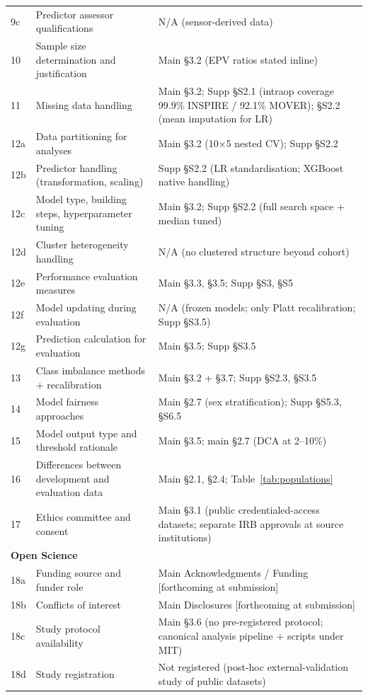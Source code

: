 \documentclass[11pt,a4paper]{article}
\begin{document}
\begin{longtable}{p{}p{}p{}}
9c  & Predictor assessor qualifications & N/A (sensor-derived data) \\
10  & Sample size determination and justification & Main §3.2 (EPV ratios stated inline) \\
11  & Missing data handling & Main §3.2; Supp §S2.1 (intraop coverage 99.9\% INSPIRE / 92.1\% MOVER); §S2.2 (mean imputation for LR) \\
12a & Data partitioning for analyses & Main §3.2 (10×5 nested CV); Supp §S2.2 \\
12b & Predictor handling (transformation, scaling) & Supp §S2.2 (LR standardisation; XGBoost native handling) \\
12c & Model type, building steps, hyperparameter tuning & Main §3.2; Supp §S2.2 (full search space + median tuned) \\
12d & Cluster heterogeneity handling & N/A (no clustered structure beyond cohort) \\
12e & Performance evaluation measures & Main §3.3, §3.5; Supp §S3, §S5 \\
12f & Model updating during evaluation & N/A (frozen models; only Platt recalibration; Supp §S3.5) \\
12g & Prediction calculation for evaluation & Main §3.5; Supp §S3.5 \\
13  & Class imbalance methods + recalibration & Main §3.2 + §3.7; Supp §S2.3, §S3.5 \\
14  & Model fairness approaches & Main §2.7 (sex stratification); Supp §S5.3, §S6.5 \\
15  & Model output type and threshold rationale & Main §3.5; main §2.7 (DCA at 2--10\%) \\
16  & Differences between development and evaluation data & Main §2.1, §2.4; Table~\ref{tab:populations} \\
17  & Ethics committee and consent & Main §3.1 (public credentialed-access datasets; separate IRB approvals at source institutions) \\
\midrule
\multicolumn{3}{l}{\textbf{Open Science}} \\
18a & Funding source and funder role & Main Acknowledgments / Funding [forthcoming at submission] \\
18b & Conflicts of interest & Main Disclosures [forthcoming at submission] \\
18c & Study protocol availability & Main §3.6 (no pre-registered protocol; canonical analysis pipeline + scripts under MIT) \\
18d & Study registration & Not registered (post-hoc external-validation study of public datasets) \\

\end{longtable}
\end{document}
